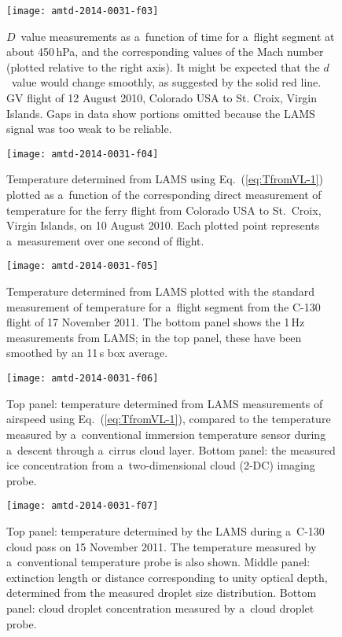 \documentclass[amtd, online, hvmath]{copernicus}
\begin{document}
\begin{figure}
\texttt{[image: amtd-2014-0031-f03]}
\caption{$D$~value measurements as a~function of time for a~flight
  segment at about 450\,hPa, and the corresponding values of the Mach
  number (plotted relative to the right axis). It might be expected
  that the $d$~value would change smoothly, as suggested by the solid
  red line. GV flight of 12 August 2010, Colorado USA to St. Croix,
  Virgin Islands. Gaps in data show portions omitted because the LAMS
  signal was too weak to be reliable.}
\label{fig:D-value-measurements}
\end{figure}

\begin{figure}
\texttt{[image: amtd-2014-0031-f04]}
\caption{Temperature determined from LAMS using
  Eq.~(\ref{eq:TfromVL-1}) plotted as a~function of the corresponding
  direct measurement of temperature for the ferry flight from Colorado
  USA to St.~Croix, Virgin Islands, on 10 August 2010. Each plotted
  point represents a~measurement over one second of flight.}
\label{fig:ATL}
\end{figure}

\begin{figure}
\texttt{[image: amtd-2014-0031-f05]}
\caption{Temperature determined from LAMS plotted with the standard
  measurement of temperature for a~flight segment from the C-130
  flight of 17 November 2011. The bottom panel shows the 1\,Hz
  measurements from LAMS; in the top panel, these have been smoothed
  by an 11\,s box average.}
\label{fig:TLAMSvsATX}
\end{figure}

\begin{figure}
\texttt{[image: amtd-2014-0031-f06]}
\caption{Top panel: temperature determined from LAMS measurements of
  airspeed using Eq.~(\ref{eq:TfromVL-1}), compared to the temperature
  measured by a~conventional immersion temperature sensor during
  a~descent through a~cirrus cloud layer. Bottom panel: the measured
  ice concentration from a~two-dimensional cloud (2-DC) imaging
  probe.}
\label{fig:ATLinCirrus}
\end{figure}

\begin{figure}
\texttt{[image: amtd-2014-0031-f07]}
\caption{Top panel: temperature determined by the LAMS during a~C-130
  cloud pass on 15 November 2011. The temperature measured by
  a~conventional temperature probe is also shown. Middle panel:
  extinction length or distance corresponding to unity optical depth,
  determined from the measured droplet size distribution. Bottom
  panel: cloud droplet concentration measured by a~cloud droplet
  probe.}
\label{fig:ATLinWaterCloud}
\end{figure}
\end{document}
